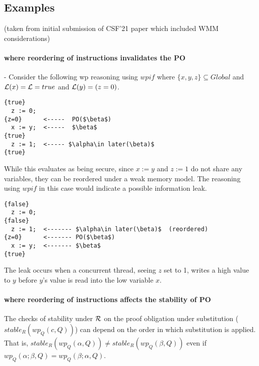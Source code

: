 
\subsection{Examples}
 
  (taken from initial submission of CSF'21 paper which included WMM considerations)

\paragraph{where reordering of instructions invalidates the PO}
-  Consider the following wp reasoning using $wpi\!f$ where $\{x,y,z\}\subseteq Global$ and
$\mathcal{L}(x)=\mathcal{L}=true$ and $\mathcal{L}(y)= (z=0)$.


\begin{lstlisting}
{true}
  z := 0;
{z=0}      <-----  PO($\beta$)
  x := y;  <-----  $\beta$ 
{true}
  z := 1;  <----- $\alpha\in later(\beta)$
{true}
\end{lstlisting}


While this evaluates as being secure, since $x:=y$ and $z:=1$ do not
share any variables, they can be reordered under a weak memory
model. The reasoning using $wpi\!f$ in this case would indicate a
possible information leak. 

\begin{lstlisting}
{false}
  z := 0;
{false}
  z := 1;  <------- $\alpha\in later(\beta)$  (reordered)
{z=0}      <------- PO($\beta$)
  x := y;  <------- $\beta$
{true}
\end{lstlisting}
The leak occurs when a concurrent thread, seeing $z$ set to 1, writes a high value to $y$ before $y$'s value is read into the low variable $x$.


\paragraph{ where reordering of instructions affects the stability of PO}

The checks of stability under $\mathcal{R}$ on the proof obligation under substitution ($stable_R(wp_Q(c,Q))$) can depend on the order in which substitution is applied. That is, $stable_R(wp_Q(\alpha,Q))\neq stable_R(wp_Q(\beta,Q))$ even if $wp_Q(\alpha;\beta, Q)=wp_Q(\beta;\alpha, Q)$.

